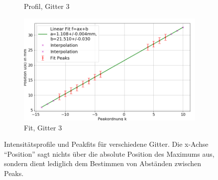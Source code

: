 \documentclass[
	a4paper,
	12pt,
	pagesize,
	ngerman
]{scrartcl}
\begin{document}
\begin{figure}[H]
\begin{subfigure}[b]{0.475\textwidth}
            \caption%
            {Profil, Gitter 3}
            \label{fig_3_profil_g3}
        \end{subfigure}
        \hfill
        \begin{subfigure}[b]{0.475\textwidth}
            \centering
            \includegraphics[width=\textwidth]{img/3/3_trafo_g3_fit}
            \caption[]%
            {Fit, Gitter 3}
            \label{fig_3_fit_g3}
        \end{subfigure}
        \caption%
        {
				Intensitätsprofile und Peakfits für verschiedene Gitter.
				Die x-Achse \enquote{Position} sagt nichts über die absolute Position des Maximums aus, sondern dient lediglich dem Bestimmen von Abständen zwischen Peaks.
				}
        \label{fig_3_mix_1}
    \end{figure}
\end{document}
